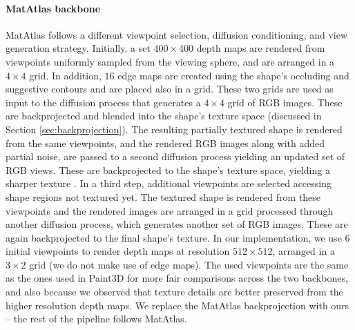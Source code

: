 \paragraph{MatAtlas backbone}
MatAtlas \cite{Ceylan:2024:Matatlas} follows a different viewpoint selection, diffusion conditioning,
 and view generation strategy. Initially, a set  
 $400  \times 400$ depth maps are rendered from viewpoints  uniformly sampled from the viewing sphere, and are arranged in a $4 \times 4$ grid.
  In addition, $16$ edge maps are created using the shape's occluding and suggestive contours and are placed also in a grid. These two grids are used as input to the diffusion process that generates a $4 \times 4$ grid of RGB images. These are backprojected and blended into the shape's texture space (discussed in Section \ref{sec:backprojection}). The resulting partially textured shape is rendered from the same viewpoints, and the rendered RGB images along with added partial noise, are passed to a second diffusion process yielding an updated set of RGB views. These are backprojected to the shape's texture space, yielding a sharper texture \cite{Ceylan:2024:Matatlas}. In a third step, additional viewpoints are selected accessing shape regions not textured yet. The textured shape is rendered from these viewpoints and the rendered images are arranged in a grid processed through another diffusion process, which generates another set of RGB images. These are again backprojected to the final shape's texture. In our implementation, we use $6$ initial viewpoints to render depth maps at resolution $512 \times 512$, arranged in a $3 \times 2$ grid (we do not make use of edge maps). The used viewpoints are the same as the ones used in Paint3D for more fair comparisons across the two backbones, and also because we observed that texture details are better preserved from the higher resolution
  depth maps. We replace the MatAtlas backprojection with ours -- the rest of the pipeline follows
  MatAtlas.
  

